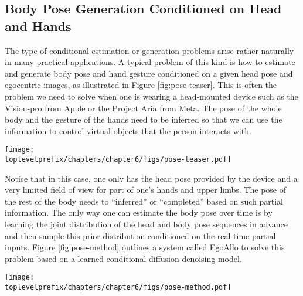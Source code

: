 \documentclass[../../book-main.tex]{subfiles}
\begin{document}
\subsection{Body Pose Generation Conditioned on Head and Hands}\label{sub:ego-allo}
The type of
conditional estimation or generation problems arise rather naturally in many
practical applications. 
A typical problem of this kind is how to estimate and generate body pose and hand gesture conditioned on a given head pose and egocentric images, as illustrated in Figure \ref{fig:pose-teaser}. This is often the problem we need to solve when one is wearing a head-mounted device such as the Vision-pro from Apple or the Project Aria from Meta. The pose of the whole body and the gesture of the hands need to be inferred so that we can use the information to control virtual objects that the person interacts with.
\begin{figure*}[t]
  \centering
  \texttt{[image: \\toplevelprefix/chapters/chapter6/figs/pose-teaser.pdf]}
    \caption{
A system that estimates human body height, pose,  and hand parameters (middle), conditioned on ego-centric SLAM poses and images (left). Outputs capture the wearer's actions in the allocentric reference frame of the scene, which we visualize here with 3D reconstructions (right).
  }
  \label{fig:pose-teaser}

\end{figure*}

Notice that in this case, one only has the head pose  provided by the device and a very limited field of view for part of one's hands and upper limbs. The pose of the rest of the body needs to ``inferred'' or ``completed'' based on such partial information. The only way one can estimate the body pose over time is by learning the joint distribution of the head and body pose sequences in advance and then sample this prior distribution conditioned on the real-time partial inputs. Figure \ref{fig:pose-method} outlines a system called EgoAllo \cite{yi2024egoallo} to solve this problem based on a learned conditional diffusion-denoising model. 
\begin{figure*}[t]
  \centering
  \texttt{[image: \\toplevelprefix/chapters/chapter6/figs/pose-method.pdf]}
\caption{
    \textbf{Overview of technical components of EgoAllo \cite{yi2024egoallo}.}
    A diffusion model is pretrained that can generate body pose sequence based on local body parameters (middle).
    An invariant parameterization $g(\cdot)$ of SLAM poses (left) is used to condition the diffusion model. These can be placed into the global coordinate frame via global alignment to input poses.
    When available, egocentric video is used for hand detection (left) via HaMeR~\cite{pavlakos2023reconstructing}, which can be incorporated into samples via guidance by the generated gesture.
  }
  \label{fig:pose-method}
\end{figure*}
\end{document}
